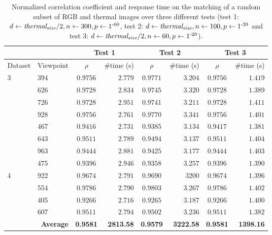\renewcommand{\arraystretch}{1.15}
\begin{table}[t]
    \caption{Normalized correlation coefficient and response time on the matching of a random subset of RGB and thermal images over three different tests (test 1: $d \gets \textit{thermal}_{\textit{size}} / 2, n \gets 300, p \gets 1\textsuperscript{-60}$, test 2: $d \gets \textit{thermal}_{\textit{size}}, n \gets 100, p \gets 1\textsuperscript{-20}$ and test 3: $d \gets \textit{thermal}_{\textit{size}} / 2, n \gets 60, p \gets 1\textsuperscript{-20}$).}
    \label{table:thermal_rgb_correlation}
    \begin{tabular}{ll|cr|cr|cr}
        \toprule
        \multicolumn{2}{c}{} & \multicolumn{2}{c}{Test 1} & \multicolumn{2}{c}{Test 2} & \multicolumn{2}{c}{Test 3}\\
        \toprule
        Dataset & Viewpoint & $\rho$ & \#time (\si{\second}) & $\rho$ & \#time (\si{\second}) & $\rho$ & \#time (\si{\second})\\
        \cmidrule{1-8}
        \multirow{8}{*}{3} & 394 & $0.9756$ & $2.779$ & $0.9771$ & $3.204$ & $0.9756$ & $1.419$\\
        & 626 & $0.9728$ & $2.834$ & $0.9745$ & $3.320$ & $0.9728$ & $1.389$\\
        & 726 & $0.9728$ & $2.951$ & $0.9741$ & $3.211$ & $0.9728$ & $1.411$\\ 
        & 928 & $0.9756$ & $2.761$ & $0.9770$ & $3.341$ & $0.9756$ & $1.401$\\
        & 467 & $0.9416$ & $2.731$ & $0.9385$ & $3.134$ & $0.9417$ & $1.381$\\
        & 643 & $0.9511$ & $2.789$ & $0.9494$ & $3.137$ & $0.9511$ & $1.404$\\ 
        & 963 & $0.9444$ & $2.881$ & $0.9425$ & $3.177$ & $0.9444$ & $1.403$\\
        & 475 & $0.9396$ & $2.946$ & $0.9358$ & $3.257$ & $0.9396$ & $1.390$\\
        \cmidrule{1-8}
        \multirow{4}{*}{4} & 922 & $0.9674$ & $2.791$ & $0.9690$ & $3200$ & $0.9674$ & $1.396$\\
        & 554 & $0.9786$ & $2.790$ & $0.9803$ & $3.267$ & $0.9786$ & $1.402$\\
        & 405 & $0.9266$ & $2.716$ & $0.9265$ & $3.187$ & $0.9266$ & $1.400$\\
        & 607 & $0.9511$ & $2.794$ & $0.9502$ & $3.236$ & $0.9511$ & $1.382$\\
        \cmidrule{1-8}
        \multicolumn{2}{r|}{\textbf{Average}} & \textbf{0.9581} & \textbf{2813.58} & \textbf{0.9579} & \textbf{3222.58} & \textbf{0.9581} & \textbf{1398.16}\\
        \bottomrule
    \end{tabular}
\end{table}
\renewcommand{\arraystretch}{1}

